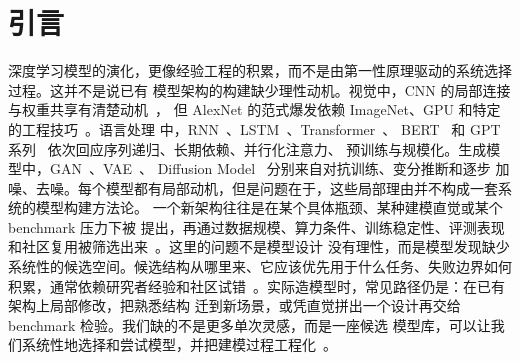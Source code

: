 \documentclass[11pt]{article}
\theoremstyle{definition}
\theoremstyle{plain}
\begin{document}

\section{引言}\label{sec:intro}


深度学习模型的演化，更像经验工程的积累，而不是由第一性原理驱动的系统选择过程。这并不是说已有
模型架构的构建缺少理性动机。视觉中，CNN 的局部连接与权重共享有清楚动机~\citep{lecun1998gradient}，
但 AlexNet 的范式爆发依赖 ImageNet、GPU 和特定的工程技巧~\citep{krizhevsky2012imagenet}。语言处理
中，RNN~\citep{elman1990finding}、LSTM~\citep{hochreiter1997long}、Transformer~\citep{vaswani2017attention}、
BERT~\citep{devlin2019bert} 和 GPT 系列~\citep{brown2020language} 依次回应序列递归、长期依赖、并行化注意力、
预训练与规模化。生成模型中，GAN~\citep{goodfellow2014generative}、VAE~\citep{kingma2014autoencoding}、
Diffusion Model~\citep{sohldickstein2015deep, ho2020denoising} 分别来自对抗训练、变分推断和逐步
加噪、去噪。每个模型都有局部动机，但是问题在于，这些局部理由并不构成一套系统的模型构建方法论。
一个新架构往往是在某个具体瓶颈、某种建模直觉或某个 benchmark 压力下被
提出，再通过数据规模、算力条件、训练稳定性、评测表现和社区复用被筛选出来~\citep{lipton2018troubling}。这里的问题不是模型设计
没有理性，而是模型发现缺少系统性的候选空间。候选结构从哪里来、它应该优先用于什么任务、失败边界如何
积累，通常依赖研究者经验和社区试错~\citep{elsken2019neural}。实际造模型时，常见路径仍是：在已有架构上局部修改，把熟悉结构
迁到新场景，或凭直觉拼出一个设计再交给 benchmark 检验。我们缺的不是更多单次灵感，而是一座候选
模型库，可以让我们系统性地选择和尝试模型，并把建模过程工程化~\citep{he2021automl,radosavovic2020designing}。
\end{document}
